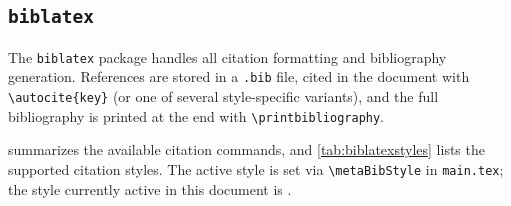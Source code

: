 	\subsection{\texttt{biblatex}}\label{sec:biblatex}
	The \texttt{biblatex} package handles all citation formatting and bibliography generation. References are stored in a \texttt{.bib} file, cited in the document with \texttt{\textbackslash autocite\{key\}} (or one of several style-specific variants), and the full bibliography is printed at the end with \texttt{\textbackslash printbibliography}.
	
	 summarizes the available citation commands, and \cref{tab:biblatexstyles} lists the supported citation styles. The active style is set via \texttt{\textbackslash metaBibStyle} in \texttt{main.tex}; the style currently active in this document is \texttt{\metaBibStyle}.
	
